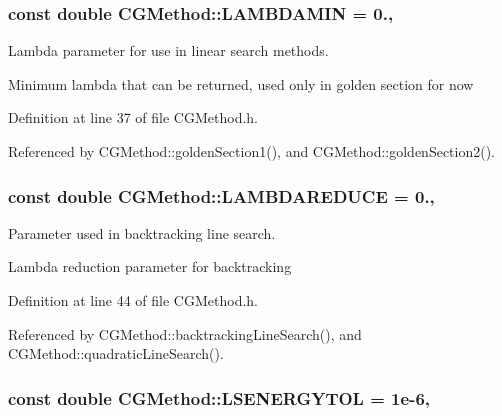 \hypertarget{classCGMethod_ae28b20ab18f9a0b7c6a1c443add1026e}{
\subsubsection[{L\+A\+M\+B\+D\+A\+M\+I\+N}]{\setlength{\rightskip}{0pt plus 5cm}const double C\+G\+Method\+::\+L\+A\+M\+B\+D\+A\+M\+I\+N = 0.\hspace{0.3cm}{\ttfamily [protected]}, {\ttfamily [inherited]}}}\label{classCGMethod_ae28b20ab18f9a0b7c6a1c443add1026e}


Lambda parameter for use in linear search methods. 

Minimum lambda that can be returned, used only in golden section for now 

Definition at line 37 of file C\+G\+Method.\+h.



Referenced by C\+G\+Method\+::golden\+Section1(), and C\+G\+Method\+::golden\+Section2().

\hypertarget{classCGMethod_a0fa651bde0efa2e195ec6a367a0e346e}{
\subsubsection[{L\+A\+M\+B\+D\+A\+R\+E\+D\+U\+C\+E}]{\setlength{\rightskip}{0pt plus 5cm}const double C\+G\+Method\+::\+L\+A\+M\+B\+D\+A\+R\+E\+D\+U\+C\+E = 0.\hspace{0.3cm}{\ttfamily [protected]}, {\ttfamily [inherited]}}}\label{classCGMethod_a0fa651bde0efa2e195ec6a367a0e346e}


Parameter used in backtracking line search. 

Lambda reduction parameter for backtracking 

Definition at line 44 of file C\+G\+Method.\+h.



Referenced by C\+G\+Method\+::backtracking\+Line\+Search(), and C\+G\+Method\+::quadratic\+Line\+Search().

\hypertarget{classCGMethod_a084794992bdcec9285f6512b56e6c578}{
\subsubsection[{L\+S\+E\+N\+E\+R\+G\+Y\+T\+O\+L}]{\setlength{\rightskip}{0pt plus 5cm}const double C\+G\+Method\+::\+L\+S\+E\+N\+E\+R\+G\+Y\+T\+O\+L = 1e-\/6\hspace{0.3cm}{\ttfamily [protected]}, {\ttfamily [inherited]}}}\label{classCGMethod_a084794992bdcec9285f6512b56e6c578}


